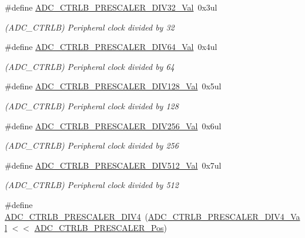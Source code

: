 \begin{DoxyCompactItemize}
\#define \mbox{\hyperlink{group___s_a_m_d21___a_d_c_gafd19aa73d07682c0d5d7fdda8ab230b5}{A\+D\+C\+\_\+\+C\+T\+R\+L\+B\+\_\+\+P\+R\+E\+S\+C\+A\+L\+E\+R\+\_\+\+D\+I\+V32\+\_\+\+Val}}~0x3ul
\begin{DoxyCompactList}\small\item\em (A\+D\+C\+\_\+\+C\+T\+R\+LB) Peripheral clock divided by 32 \end{DoxyCompactList}\item 
\#define \mbox{\hyperlink{group___s_a_m_d21___a_d_c_gafe5f527bda931e57829d72bfd2e9497f}{A\+D\+C\+\_\+\+C\+T\+R\+L\+B\+\_\+\+P\+R\+E\+S\+C\+A\+L\+E\+R\+\_\+\+D\+I\+V64\+\_\+\+Val}}~0x4ul
\begin{DoxyCompactList}\small\item\em (A\+D\+C\+\_\+\+C\+T\+R\+LB) Peripheral clock divided by 64 \end{DoxyCompactList}\item 
\#define \mbox{\hyperlink{group___s_a_m_d21___a_d_c_ga358d362ec0e79900891a5f240fdab4ec}{A\+D\+C\+\_\+\+C\+T\+R\+L\+B\+\_\+\+P\+R\+E\+S\+C\+A\+L\+E\+R\+\_\+\+D\+I\+V128\+\_\+\+Val}}~0x5ul
\begin{DoxyCompactList}\small\item\em (A\+D\+C\+\_\+\+C\+T\+R\+LB) Peripheral clock divided by 128 \end{DoxyCompactList}\item 
\#define \mbox{\hyperlink{group___s_a_m_d21___a_d_c_gaf654c74504398792bf66d522f00673fa}{A\+D\+C\+\_\+\+C\+T\+R\+L\+B\+\_\+\+P\+R\+E\+S\+C\+A\+L\+E\+R\+\_\+\+D\+I\+V256\+\_\+\+Val}}~0x6ul
\begin{DoxyCompactList}\small\item\em (A\+D\+C\+\_\+\+C\+T\+R\+LB) Peripheral clock divided by 256 \end{DoxyCompactList}\item 
\#define \mbox{\hyperlink{group___s_a_m_d21___a_d_c_ga95ad89ae1a278d5beaec0363f3492dd2}{A\+D\+C\+\_\+\+C\+T\+R\+L\+B\+\_\+\+P\+R\+E\+S\+C\+A\+L\+E\+R\+\_\+\+D\+I\+V512\+\_\+\+Val}}~0x7ul
\begin{DoxyCompactList}\small\item\em (A\+D\+C\+\_\+\+C\+T\+R\+LB) Peripheral clock divided by 512 \end{DoxyCompactList}\item 
\#define \mbox{\hyperlink{group___s_a_m_d21___a_d_c_ga914326a1bec32859ed4b60ad4125eaf6}{A\+D\+C\+\_\+\+C\+T\+R\+L\+B\+\_\+\+P\+R\+E\+S\+C\+A\+L\+E\+R\+\_\+\+D\+I\+V4}}~(\mbox{\hyperlink{group___s_a_m_d21___a_d_c_gaba2eeed7d542b9de1eb9a50e78acd772}{A\+D\+C\+\_\+\+C\+T\+R\+L\+B\+\_\+\+P\+R\+E\+S\+C\+A\+L\+E\+R\+\_\+\+D\+I\+V4\+\_\+\+Val}}  $<$$<$ \mbox{\hyperlink{group___s_a_m_d21___a_d_c_ga67bbef18402c0d73dcc1698fa185ab76}{A\+D\+C\+\_\+\+C\+T\+R\+L\+B\+\_\+\+P\+R\+E\+S\+C\+A\+L\+E\+R\+\_\+\+Pos}})
$$
\end{DoxyCompactItemize}
